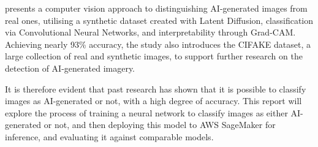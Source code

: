 \cite{bird2023cifakeimageclassificationexplainable} presents a computer vision approach to distinguishing AI-generated images from real ones, utilising a synthetic dataset created with Latent Diffusion, classification via Convolutional Neural Networks, and interpretability through Grad-CAM. Achieving nearly 93\% accuracy, the study also introduces the CIFAKE dataset, a large collection of real and synthetic images, to support further research on the detection of AI-generated imagery.

It is therefore evident that past research has shown that it is possible to classify images as AI-generated or not, with a high degree of accuracy. This report will explore the process of training a neural network to classify images as either AI-generated or not, and then deploying this model to AWS SageMaker for inference, and evaluating it against comparable models.